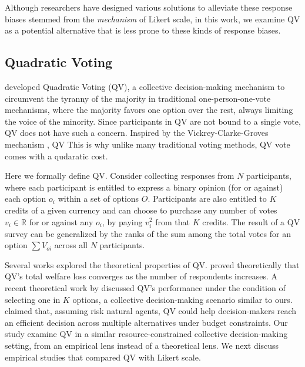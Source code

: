 Although researchers have designed various solutions to alleviate these response biases stemmed from the \textit{mechanism} of Likert scale, in this work, we examine QV as a potential alternative that is less prone to these kinds of response biases.

\subsection{Quadratic Voting}
\textcite{posner2018radical} developed Quadratic Voting (QV), a collective decision-making mechanism \cite{lalley2018quadratic} to circumvent the tyranny of the majority in traditional one-person-one-vote mechanisms, where the majority favors one option over the rest, always limiting the voice of the minority. Since participants in QV are not bound to a single vote, QV does not have such a concern. Inspired by the Vickrey-Clarke-Groves mechanism \cite{roughgarden2010algorithmic}, QV  This is why unlike many traditional voting methods, QV vote comes with a qudaratic cost. 


Here we formally define QV. Consider collecting responses from $N$ participants, where each participant is entitled to express a binary opinion (for or against) each option $o_i$ within a set of options $O$. Participants are also entitled to $K$ credits of a given currency and can choose to purchase any number of votes $v_i \in \mathbb{R}$ for or against any $o_i$, by paying $v_i^2$ from that $K$ credits. The result of a QV survey can be generalized by the ranks of the sum among the total votes for an option $\sum{V_{oi}}$ across all $N$ participants.\par

Several works explored the theoretical properties of QV. \textcite{lalley2018quadratic} proved theoretically that QV's total welfare loss converges as the number of respondents increases. A recent theoretical work by \textcite{eguia2019quadratic} discussed QV's performance under the condition of selecting one in $K$ options, a collective decision-making scenario similar to ours. \textcite{eguia2019quadratic} claimed that, assuming risk natural agents, QV could help decision-makers reach an efficient decision across multiple alternatives under budget constraints. Our study examine QV in a similar resource-constrained collective decision-making setting, from an empirical lens instead of a theoretical lens. We next discuss empirical studies that compared QV with Likert scale.

